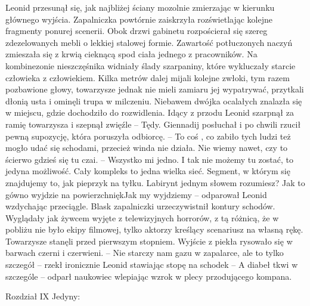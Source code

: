 \documentclass[../MAIN.tex]{subfiles}
\begin{document}
Leonid przesunął się, jak najbliżej ściany mozolnie zmierzając w kierunku głównego wyjścia. Zapalniczka powtórnie zaiskrzyła rozświetlając kolejne fragmenty ponurej scenerii. Obok drzwi gabinetu rozpościerał się szereg zdezelowanych mebli o lekkiej stalowej formie. Zawartość potłuczonych naczyń zmieszała się z krwią cieknącą spod ciała jednego z pracowników. Na kombinezonie nieszczęśnika widniały ślady szarpaniny, które wykluczały starcie człowieka z człowiekiem. Kilka metrów dalej mijali kolejne zwłoki, tym razem pozbawione głowy, towarzysze jednak nie mieli zamiaru jej wypatrywać, przytkali dłonią usta i ominęli trupa w milczeniu. Niebawem dwójka ocalałych znalazła się w miejscu, gdzie dochodziło do rozwidlenia. Idący z przodu Leonid szarpnął za ramię towarzysza i szepnął zwięźle 
-- Tędy. 
Giennadij posłuchał i po chwili rzucił pewną supozycję, która poruszyła odbiorcę. 
-- To coś , co zabiło tych ludzi też mogło udać się schodami, przecież winda nie działa. Nie wiemy nawet, czy to ścierwo gdzieś się tu czai. 
-- Wszystko mi jedno. I tak nie możemy tu zostać, to jedyna możliwość. Cały kompleks to jedna wielka sieć. Segment, w którym się znajdujemy to, jak pieprzyk na tyłku. Labirynt jednym słowem rozumiesz? Jak to gówno wyjdzie na powierzchnię\3kJak my wyjdziemy -- odparował Leonid wzdychając przeciągle. 
Blask zapalniczki urzeczywistnił kontury schodów. Wyglądały jak żywcem wyjęte z telewizyjnych horrorów, z tą różnicą, że w pobliżu nie było ekipy filmowej, tylko aktorzy kreślący scenariusz na własną rękę. Towarzysze stanęli przed pierwszym stopniem. Wyjście z piekła rysowało się w barwach czerni i czerwieni. 
-- Nie starczy nam gazu w zapalarce, ale to tylko szczegół -- rzekł ironicznie Leonid stawiając stopę na schodek 
-- A diabeł tkwi w szczególe -- odparł naukowiec wlepiając wzrok w plecy przodującego kompana.


Rozdział IX
Jedyny:  
\end{document}
